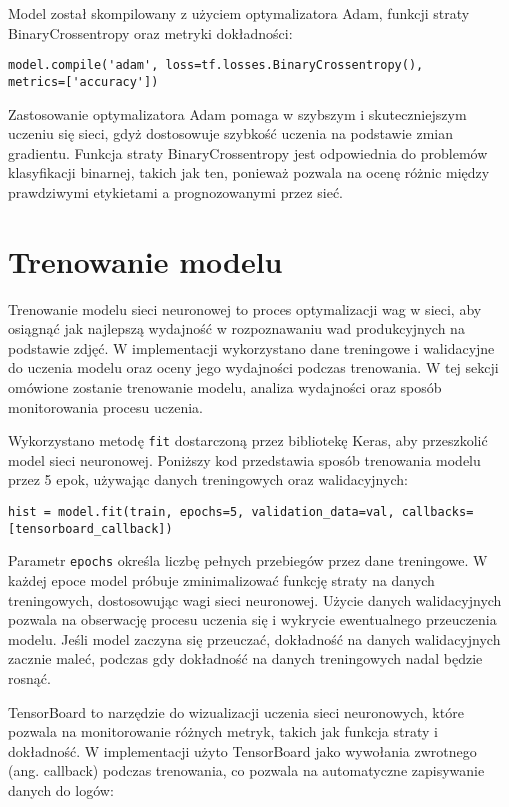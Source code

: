 Model został skompilowany z użyciem optymalizatora Adam, funkcji straty BinaryCrossentropy oraz metryki dokładności:

\begin{verbatim}
model.compile('adam', loss=tf.losses.BinaryCrossentropy(),
metrics=['accuracy'])
\end{verbatim}

Zastosowanie optymalizatora Adam pomaga w szybszym i skuteczniejszym uczeniu się sieci, gdyż dostosowuje szybkość uczenia na podstawie zmian gradientu. Funkcja straty BinaryCrossentropy jest odpowiednia do problemów klasyfikacji binarnej, takich jak ten, ponieważ pozwala na ocenę różnic między prawdziwymi etykietami a prognozowanymi przez sieć.

\section{Trenowanie modelu}

Trenowanie modelu sieci neuronowej to proces optymalizacji wag w sieci, aby osiągnąć jak najlepszą wydajność w rozpoznawaniu wad produkcyjnych na podstawie zdjęć. W implementacji wykorzystano dane treningowe i walidacyjne do uczenia modelu oraz oceny jego wydajności podczas trenowania. W tej sekcji omówione zostanie trenowanie modelu, analiza wydajności oraz sposób monitorowania procesu uczenia.

Wykorzystano metodę \verb|fit| dostarczoną przez bibliotekę Keras, aby przeszkolić model sieci neuronowej. Poniższy kod przedstawia sposób trenowania modelu przez 5 epok, używając danych treningowych oraz walidacyjnych:

\begin{verbatim}
hist = model.fit(train, epochs=5, validation_data=val, callbacks=[tensorboard_callback])
\end{verbatim}

Parametr \verb|epochs| określa liczbę pełnych przebiegów przez dane treningowe. W każdej epoce model próbuje zminimalizować funkcję straty na danych treningowych, dostosowując wagi sieci neuronowej. Użycie danych walidacyjnych pozwala na obserwację procesu uczenia się i wykrycie ewentualnego przeuczenia modelu. Jeśli model zaczyna się przeuczać, dokładność na danych walidacyjnych zacznie maleć, podczas gdy dokładność na danych treningowych nadal będzie rosnąć.

TensorBoard to narzędzie do wizualizacji uczenia sieci neuronowych, które pozwala na monitorowanie różnych metryk, takich jak funkcja straty i dokładność. W implementacji użyto TensorBoard jako wywołania zwrotnego (ang. callback) podczas trenowania, co pozwala na automatyczne zapisywanie danych do logów:

